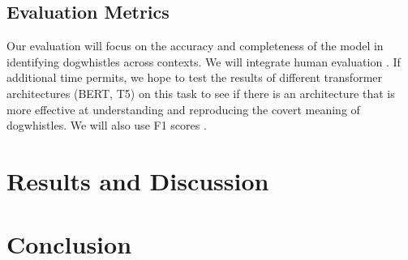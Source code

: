 \documentclass[11pt]{article}
\begin{document}
\subsection{Evaluation Metrics}
Our evaluation will focus on the accuracy and completeness of the model in identifying dogwhistles across contexts. We will integrate human evaluation \cite{mendelsohn2023dogwhistles}. If additional time permits, we hope to test the results of different transformer architectures (BERT, T5) on this task to see if there is an architecture that is more effective at understanding and reproducing the covert meaning of dogwhistles. We will also use F1 scores \cite{defersha2021detection}.

\section{Results and Discussion}

\section{Conclusion}



\nocite{*}

\end{document}
